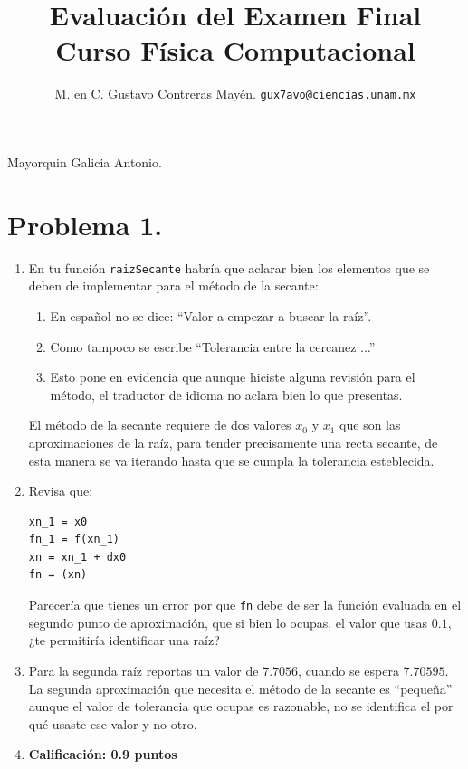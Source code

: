 
\usepackage{minted}

\author{M. en C. Gustavo Contreras Mayén. \texttt{gux7avo@ciencias.unam.mx}}
\title{Evaluación del Examen Final \\ {\large Curso Física Computacional}}
\date{ }


\maketitle
\fontsize{14}{14}\selectfont

\Large{Mayorquin Galicia Antonio.}

\section{Problema 1.}

\begin{enumerate}
\item En tu función \texttt{raizSecante} habría que aclarar bien los elementos que se deben de implementar para el método de la secante:
\begin{enumerate}
\item En español no se dice: \enquote{Valor a empezar a buscar la raíz}.
\item Como tampoco se escribe \enquote{Tolerancia entre la cercanez ...}
\item Esto pone en evidencia que aunque hiciste alguna revisión para el método, el traductor de idioma no aclara bien lo que presentas.
\end{enumerate}
El método de la secante requiere de dos valores $x_{0}$ y $x_{1}$ que son las aproximaciones de la raíz, para tender precisamente una recta secante, de esta manera se va iterando hasta que se cumpla la tolerancia esteblecida.
\item Revisa que:
\begin{verbatim}
xn_1 = x0
fn_1 = f(xn_1)
xn = xn_1 + dx0
fn = (xn) 
\end{verbatim}
Parecería que tienes un error por que \texttt{fn} debe de ser la función evaluada en el segundo punto de aproximación, que si bien lo ocupas, el valor que usas $0.1$, ¿te permitiría identificar una raíz?
\item Para la segunda raíz reportas un valor de $7.7056$, cuando se espera $7.70595$. La segunda aproximación que necesita el método de la secante es \enquote{pequeña} aunque el valor de tolerancia que ocupas es razonable, no se identifica el por qué usaste ese valor y no otro.
\item \textbf{Calificación: 0.9 puntos}
\end{enumerate}

